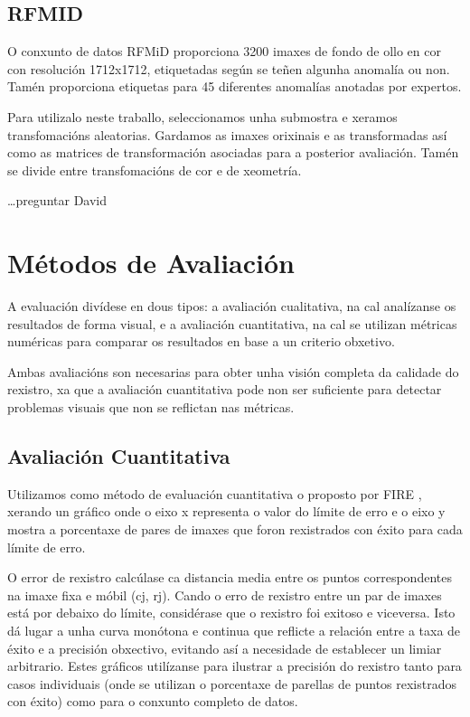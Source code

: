 \subsection{RFMID}
\label{subsec:RFMID}

O conxunto de datos RFMiD \cite{RFMiD} proporciona 3200 imaxes de fondo de ollo en cor con resolución 1712x1712, etiquetadas según se teñen algunha anomalía ou non. 
Tamén proporciona etiquetas para 45 diferentes anomalías anotadas por expertos.

Para utilizalo neste traballo, seleccionamos unha submostra e xeramos transfomacións aleatorias. Gardamos as imaxes orixinais e as transformadas así como as matrices de transformación asociadas para a posterior avaliación.
Tamén se divide entre transfomacións de cor e de xeometría.

\dots preguntar David

\section{Métodos de Avaliación}
\label{sec:Métodos de Avaliación}

A evaluación divídese en dous tipos: a avaliación cualitativa, na cal analízanse os resultados de forma visual,
 e a avaliación cuantitativa, na cal se utilizan métricas numéricas para comparar os resultados en base a un criterio obxetivo.

 Ambas avaliacións son necesarias para obter unha visión completa da calidade do rexistro, xa que a avaliación cuantitativa pode non ser suficiente para detectar problemas visuais que non se reflictan nas métricas.

 \subsection{Avaliación Cuantitativa}
 \label{subsec:Avaliación Cuantitativa}
 
 Utilizamos como método de evaluación cuantitativa o proposto por FIRE \cite{FIRE},
 xerando un gráfico onde o eixo x representa o valor do límite de erro e o eixo y mostra a porcentaxe de pares de imaxes que foron rexistrados con éxito para cada límite de erro.
 
 O error de rexistro calcúlase ca distancia media entre os puntos correspondentes na imaxe fixa e móbil (cj, rj).
 Cando o erro de rexistro entre un par de imaxes está por debaixo do límite, considérase que o rexistro foi exitoso e viceversa. Isto dá lugar a unha curva monótona e continua que reflicte a relación entre a taxa de éxito e a precisión obxectivo, evitando así a necesidade de establecer un limiar arbitrario. 
 Estes gráficos utilízanse para ilustrar a precisión do rexistro tanto para casos individuais (onde se utilizan o porcentaxe de parellas de puntos rexistrados con éxito)
  como para o conxunto completo de datos.
 
